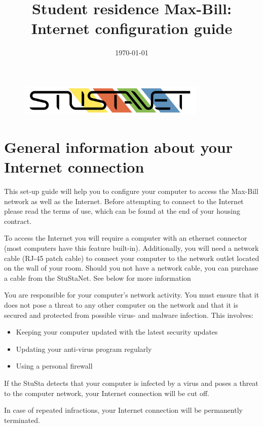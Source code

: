 \documentclass[a4paper,12pt]{scrartcl}
\title{Student residence Max-Bill:\\
       Internet configuration guide}
\date{\today}
\begin{document}
\maketitle

\begin{figure}[t!]
   \centering
   \vspace{-20pt}
   \includegraphics[width=0.8\textwidth,keepaspectratio]{Bilder/StuStaNet_Logo}
   \vspace{-20pt}
\end{figure}

\section*{General information about your Internet connection}

This set-up guide will help you to configure your computer to access the Max-Bill network as well as the Internet. Before attempting to connect to the Internet please read the terms of use, which can be found at the end of your housing contract.

To access the Internet you will require a computer with an ethernet connector (most computers have this feature built-in). Additionally, you will need a network cable (RJ-45 patch cable) to connect your computer to the network outlet located on the wall of your room. Should you not have a network cable, you can purchase a cable from the StuStaNet. See below for more information

You are responsible for your computer's network activity. You must ensure that it does not pose a threat to any other computer on the network and that it is secured and protected from possible virus- and malware infection. This involves:
\begin{itemize}
    \item Keeping your computer updated with the latest security updates
    \item Updating your anti-virus program regularly
    \item Using a personal firewall
\end{itemize}
If the StuSta detects that your computer is infected by a virus and poses a threat to the computer network, your Internet connection will be cut off.

\begin{em}
In case of repeated infractions, your Internet connection will be permanently terminated.
\end{em}
\end{document}
